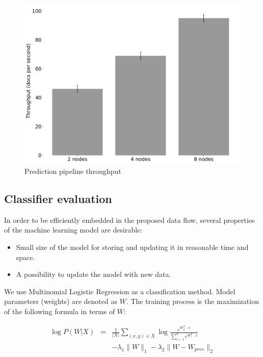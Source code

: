 \begin{figure}[htbp]
  \centering
  \includegraphics[scale=0.24]{pics/classifier_throughput}
  \caption{Prediction pipeline throughput}
  \label {throughput}
\end{figure}

\subsection{Classifier evaluation}

In order to be efficiently embedded in the proposed data flow, several properties of the machine learning model are desirable:
\begin{itemize}
     \item Small size of the model for storing and updating it in reasonable time and space.
     \item A possibility to update the model with new data.
\end{itemize}

We use Multinomial Logistic Regression as a classification method. Model parameters (weights) are denoted as $W$. The training process is the maximization of the following formula in terms of $W$:

$$ 
\begin{array}{rcl}
\log P(W | X)   & = &
 \frac 
      {1}{|X|} \sum \limits_{(x, y) \in X} \log \frac{e^{{W_y^T \cdot \; x}}}
      {\sum \limits_{l = 1}^{k}  e^{{W_{l}^T \cdot \; x}}}                  \\
  & & - \lambda_1 \parallel  W\parallel _1 
   - \lambda_2 \parallel  W - W_{prev} \parallel _2 
   \end {array}
   $$ 


